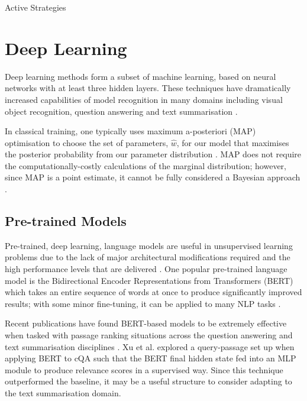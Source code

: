 \documentclass[ %
                    author={James Stephenson},
                supervisor={Dr. Edwin Simpson},
                    degree={MSc},
                     title={Project Plan: Bayesian Deep Learning For Extractive Test Summarisation},
                  subtitle={},
                      type={},
                      year={2022}]{../additions/dissertation}
\begin{document}
			Active Strategies
		
		\section{Deep Learning}
		\label{chap:literaturereview:deep}
		
		Deep learning methods form a subset of machine learning, based on neural networks with at least three hidden layers. These techniques have dramatically increased capabilities of model recognition in many domains including visual object recognition, question answering and text summarisation \cite{Lecun15, Sharma18, Azar17}. 
		

In classical training, one typically uses maximum a-posteriori (MAP) optimisation to choose the set of parameters, $\hat{w}$, for our model that maximises the posterior probability from our parameter distribution \cite{Wilson20}. MAP does not require the computationally-costly calculations of the marginal distribution; however, since MAP is a point estimate, it cannot be fully considered a Bayesian approach \cite{Hero15}.
	

		
			\subsection{Pre-trained Models}
			\label{chap:literaturereview:deep:pretrained}
			
			Pre-trained, deep learning, language models are useful in unsupervised learning problems due to the lack of major architectural modifications required and the high performance levels that are delivered \cite{Mridha21}. One popular pre-trained language model is the Bidirectional Encoder Representations from Transformers (BERT) which takes an entire sequence of words at once to produce significantly improved results; with some minor fine-tuning, it can be applied to many NLP tasks \cite{Mridha21}.

Recent publications have found BERT-based models \cite{Devlin18} to be extremely effective when tasked with passage ranking situations across the question answering and text summarisation disciplines \cite{Xu19, Qiao19}. Xu et al. \cite{Xu19} explored a query-passage set up when applying BERT to cQA such that the BERT final hidden state fed into an MLP module to produce relevance scores in a supervised way. Since this technique outperformed the baseline, it may be a useful structure to consider adapting to the text summarisation domain.
\end{document}
